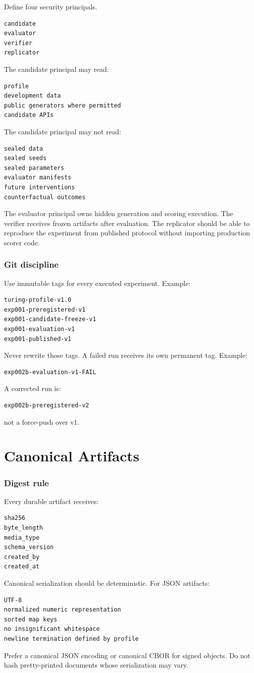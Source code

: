 \documentclass[11pt]{article}
\begin{document}
Define four security principals.
\begin{verbatim}
candidate
evaluator
verifier
replicator
\end{verbatim}
The candidate principal may read:
\begin{verbatim}
profile
development data
public generators where permitted
candidate APIs
\end{verbatim}
The candidate principal may not read:
\begin{verbatim}
sealed data
sealed seeds
sealed parameters
evaluator manifests
future interventions
counterfactual outcomes
\end{verbatim}
The evaluator principal owns hidden generation and scoring execution. The verifier receives frozen artifacts after evaluation. The replicator should be able to reproduce the experiment from published protocol without importing production scorer code.

\section{Git discipline}

Use immutable tags for every executed experiment. Example:
\begin{verbatim}
turing-profile-v1.0
exp001-preregistered-v1
exp001-candidate-freeze-v1
exp001-evaluation-v1
exp001-published-v1
\end{verbatim}
Never rewrite those tags. A failed run receives its own permanent tag. Example:
\begin{verbatim}
exp002b-evaluation-v1-FAIL
\end{verbatim}
A corrected run is:
\begin{verbatim}
exp002b-preregistered-v2
\end{verbatim}
not a force-push over v1.

\part{Canonical Artifacts}

\section{Digest rule}

Every durable artifact receives:
\begin{verbatim}
sha256
byte_length
media_type
schema_version
created_by
created_at
\end{verbatim}
Canonical serialization should be deterministic. For JSON artifacts:
\begin{verbatim}
UTF-8
normalized numeric representation
sorted map keys
no insignificant whitespace
newline termination defined by profile
\end{verbatim}
Prefer a canonical JSON encoding or canonical CBOR for signed objects. Do not hash pretty-printed documents whose serialization may vary.
\end{document}
